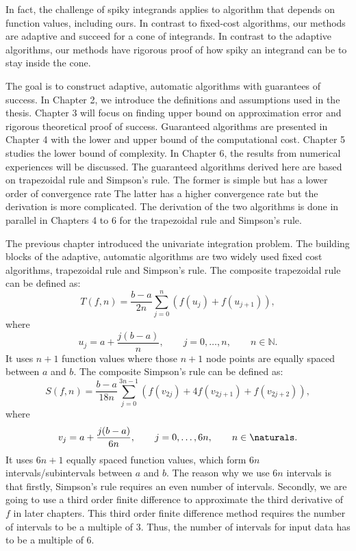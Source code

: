 \documentclass{iitthesis}
\theoremstyle{definition}
\theoremstyle{remark}
\begin{document}
In fact, the challenge of spiky integrands applies to algorithm that depends on function values, including ours. In contrast to fixed-cost algorithms, our methods are adaptive and succeed for a cone of integrands. In contrast to the adaptive algorithms, our methods have rigorous proof of how spiky an integrand can be to stay inside the cone.







The goal is to construct adaptive, automatic algorithms with guarantees of success. In Chapter 2, we introduce the definitions and assumptions used in the thesis. Chapter 3 will focus on finding upper bound on approximation error and rigorous theoretical proof of success. Guaranteed algorithms are presented in Chapter 4 with the lower and upper bound of the computational cost. Chapter 5 studies the lower bound of complexity. In Chapter 6, the results from numerical experiences will be discussed.  The guaranteed algorithms derived here are based on trapezoidal rule and Simpson's rule. The former is simple but has a lower order of convergence rate The latter has a higher convergence rate but the derivation is more complicated. The derivation of the two algorithms is done in parallel in Chapters 4 to 6 for the trapezoidal rule and Simpson's rule.

\clearpage





The previous chapter introduced the univariate integration problem. The building blocks of the adaptive, automatic algorithms are two widely used fixed cost algorithms, trapezoidal rule and Simpson's rule.
The composite trapezoidal rule can be defined as:
\begin{equation}\label{traprule}
  T(f,n)=\frac{b-a}{2n}\sum_{j=0}^{n}(f(u_{j})+f(u_{j+1})),
\end{equation}
where
\begin{equation}\label{upts}
u_j=a+\frac{j(b-a)}{n}, \qquad j=0, \ldots, n, \qquad n\in\mathbb{N}.
\end{equation}
It uses $n+1$ function values where those $n+1$ node points are equally spaced between $a$ and $b$. The composite Simpson's rule can be defined as:
\begin{equation}\label{simrule}
  S(f,n)=\frac{b-a}{18n}\sum_{j=0}^{3n-1}(f(v_{2j})+4f(v_{2j+1})+f(v_{2j+2})),
\end{equation}
where
\begin{equation}\label{vpts}
v_j=a+\frac{j(b-a)}{6n}, \qquad j=0, \ldots, 6n, \qquad n\in \naturals.
\end{equation}
It uses $6n+1$ equally spaced function values, which form $6n$ intervals/subintervals between $a$ and $b$. The reason why we use $6n$ intervals is that firstly, Simpson's rule requires an even number of intervals. Secondly, we are going to use a third order finite difference to approximate the third derivative of $f$ in later chapters. This third order finite difference method requires the number of intervals to be a multiple of 3. Thus, the number of intervals for input data has to be a multiple of 6.
\end{document}
